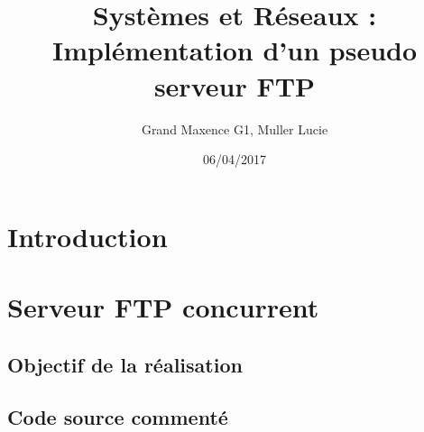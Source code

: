 \documentclass{report}
\author{Grand Maxence G1, Muller Lucie}
\title{Syst\`emes et R\'eseaux : Impl\'ementation d'un pseudo serveur FTP }
\date{06/04/2017}
\begin{document}
\maketitle
\tableofcontents

\chapter*{Introduction}

    \chapter{Serveur FTP concurrent}
      \section{Objectif de la r\'ealisation}
      \section{Code source comment\'e}
\end{document}
